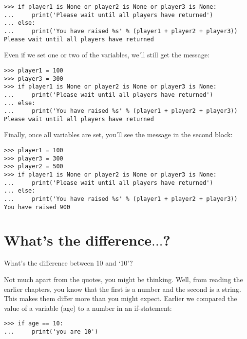 \begin{listing}
\begin{verbatim}
>>> if player1 is None or player2 is None or player3 is None:
...     print('Please wait until all players have returned')
... else:
...     print('You have raised %s' % (player1 + player2 + player3))
Please wait until all players have returned
\end{verbatim}
\end{listing}

Even if we set one or two of the variables, we'll still get the message:

\begin{listing}
\begin{verbatim}
>>> player1 = 100
>>> player3 = 300
>>> if player1 is None or player2 is None or player3 is None:
...     print('Please wait until all players have returned')
... else:
...     print('You have raised %s' % (player1 + player2 + player3))
Please wait until all players have returned
\end{verbatim}
\end{listing}

\noindent
Finally, once all variables are set, you'll see the message in the second block:

\begin{listing}
\begin{verbatim}
>>> player1 = 100
>>> player3 = 300
>>> player2 = 500
>>> if player1 is None or player2 is None or player3 is None:
...     print('Please wait until all players have returned')
... else:
...     print('You have raised %s' % (player1 + player2 + player3))
You have raised 900
\end{verbatim}
\end{listing}

\section{What's the difference$\ldots$?}\label{whatsthedifference}

What's the difference between 10 and `10'?
\par
Not much apart from the quotes, you might be thinking.  Well, from reading the earlier chapters, you know that the first is a number and the second is a string. This makes them differ more than you might expect.  Earlier we compared the value of a variable (age) to a number in an if-statement:

\begin{listing}
\begin{verbatim}
>>> if age == 10:
...     print('you are 10')
\end{verbatim}
\end{listing}


